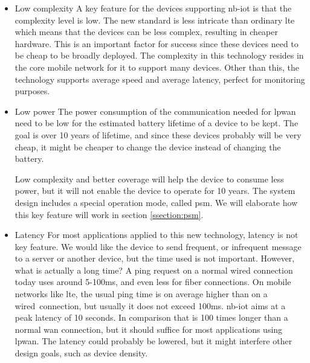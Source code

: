 \documentclass[USenglish]{ifimaster}  %
\begin{document}
\begin{itemize}
  \item Low complexity \newline %
  A key feature for the devices supporting \acrshort{nb-iot} is that the complexity level is low. The new standard is less intricate than ordinary \acrshort{lte} which means that the devices can be less complex, resulting in cheaper hardware. This is an important factor for success since these devices need to be cheap to be broadly deployed. The complexity in this technology resides in the core mobile network for it to support many devices. Other than this, the technology supports average speed and average latency, perfect for monitoring purposes.

  \item Low power \newline
  The power consumption of the communication needed for \acrshort{lpwan} need to be low for the estimated battery lifetime of a device to be kept. The goal is over 10 years of lifetime, and since these devices probably will be very cheap, it might be cheaper to change the device instead of changing the battery.

  Low complexity and better coverage will help the device to consume less power, but it will not enable the device to operate for 10 years. The system design includes a special operation mode, called \acrlong{psm}. We will elaborate how this key feature will work in section \vref{ssection:psm}.

  \item Latency \newline
  For most applications applied to this new technology, latency is not key feature. We would like the device to send frequent, or infrequent message to a server or another device, but the time used is not important. However, what is actually a long time? A ping request on a normal wired connection today uses around 5-100ms, and even less for fiber connections. On mobile networks like \acrshort{lte}, the usual ping time is on average higher than on a wired connection, but usually it does not exceed 100ms. \acrshort{nb-iot} aims at a peak latency of 10 seconds. In comparison that is 100 times longer than a normal \acrshort{wan} connection, but it should suffice for most applications using \acrshort{lpwan}. The latency could probably be lowered, but it might interfere other design goals, such as device density.


\end{itemize}
\end{document}
